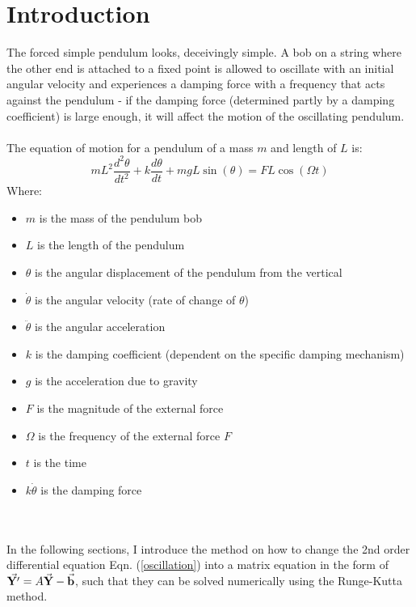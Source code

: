 \documentclass[10pt, twocolumn]{article}
\begin{document}
\section{Introduction}
The forced simple pendulum looks, deceivingly simple. A bob on a string where the other end is attached to a fixed point is allowed to oscillate with an initial angular velocity and experiences a damping force with a frequency that acts against the pendulum - if the damping force (determined partly by a damping coefficient) is large enough, it will affect the motion of the oscillating pendulum. \\
\\
The equation of motion for a pendulum of a mass $m$ and length of $L$ is:
\begin{equation}
    mL^2 \frac{d^2\theta}{dt^2} + k \frac{d\theta}{dt} + mgL\sin({\theta}) = FL\cos({\Omega}t)
    \label{oscillation}
\end{equation}
Where:
\begin{itemize}
    \item $m$ is the mass of the pendulum bob
    \item $L$ is the length of the pendulum
    \item $\theta$ is the angular displacement of the pendulum from the vertical
    \item $\dot{\theta}$ is the angular velocity (rate of change of $\theta$)
    \item $\ddot{\theta}$ is the angular acceleration
    \item $k$ is the damping coefficient (dependent on the specific damping mechanism)
    \item $g$ is the acceleration due to gravity
    \item $F$ is the magnitude of the external force
    \item $\Omega$ is the frequency of the external force $F$
    \item $t$ is the time
    \item $k\dot{\theta}$ is the damping force
\end{itemize}
\\
\\
In the following sections, I introduce the method on how to change the 2nd order differential equation Eqn. (\ref{oscillation}) into a matrix equation in the form of $\vec{\bold{Y'}} = A\vec{\bold{Y}} - \vec{\bold{b}}$, such that they can be solved numerically using the Runge-Kutta method.
\\
\\
\end{document}

